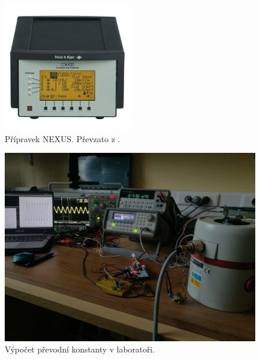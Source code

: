         \begin{figure} [!h]
            \centering
            \caption{Přípravek NEXUS. Převzato z \cite{manual:2}.}
            \includegraphics[width=0.5\textwidth]{DSP/Figs/nexus.png}
        \end{figure}       
        \begin{figure} [!t]
            \centering
            \caption{Výpočet převodní konstanty v laboratoři.}
            \includegraphics[width=\textwidth]{DSP/Figs/prakticka_zkouska.jpg}
        \end{figure} 
        
        
        
        




    
